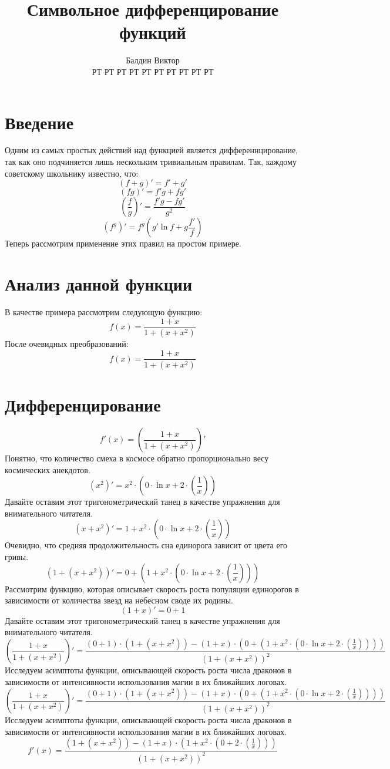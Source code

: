 \documentclass{article}
\title{Символьное дифференцирование функций}
\author{Балдин Виктор\\РТ РТ РТ РТ РТ РТ РТ РТ РТ РТ}
\begin{document}
\maketitle
\section{Введение}
Одним из самых простых действий над функцией является дифференнцирование, так как оно подчиняется лишь нескольким тривиальным правилам. Так, каждому советскому школьнику известно, что:
$$(f+g)'=f'+g'$$
$$(fg)' =f'g+fg'$$
$$\left(\frac{f}{g}\right)'=\frac{f'g-fg'}{g^2}$$
$$(f^g)'=f^g\left(g'\ln f+g\frac{f'}{f}\right)$$Теперь рассмотрим применение этих правил на простом примере.\section{Анализ данной функции}
В качестве примера рассмотрим следующую функцию:
$$f(x)=\frac{1+x}{1+\left(x+x^{2}\right)}$$
После очевидных преобразований:$$f(x)=\frac{1+x}{1+\left(x+x^{2}\right)}$$
\section{Дифференцирование}
$$f'(x)=\left(\frac{1+x}{1+\left(x+x^{2}\right)}\right)'$$
Понятно, что количество смеха в космосе обратно пропорционально весу космических анекдотов.$$\left(x^{2}\right)'=x^{2} \cdot \left(0 \cdot \ln x+2 \cdot \left(\frac{1}{x}\right)\right)$$
Давайте оставим этот тригонометрический танец в качестве упражнения для внимательного читателя.$$\left(x+x^{2}\right)'=1+x^{2} \cdot \left(0 \cdot \ln x+2 \cdot \left(\frac{1}{x}\right)\right)$$
Очевидно, что средняя продолжительность сна единорога зависит от цвета его гривы.$$\left(1+\left(x+x^{2}\right)\right)'=0+\left(1+x^{2} \cdot \left(0 \cdot \ln x+2 \cdot \left(\frac{1}{x}\right)\right)\right)$$
Рассмотрим функцию, которая описывает скорость роста популяции единорогов в зависимости от количества звезд на небесном своде их родины.$$\left(1+x\right)'=0+1$$
Давайте оставим этот тригонометрический танец в качестве упражнения для внимательного читателя.$$\left(\frac{1+x}{1+\left(x+x^{2}\right)}\right)'=\frac{\left(0+1\right) \cdot \left(1+\left(x+x^{2}\right)\right)-\left(1+x\right) \cdot \left(0+\left(1+x^{2} \cdot \left(0 \cdot \ln x+2 \cdot \left(\frac{1}{x}\right)\right)\right)\right)}{\left(1+\left(x+x^{2}\right)\right)^{2}}$$
Исследуем асимптоты функции, описывающей скорость роста числа драконов в зависимости от интенсивности использования магии в их ближайших логовах.$$\left(\frac{1+x}{1+\left(x+x^{2}\right)}\right)'=\frac{\left(0+1\right) \cdot \left(1+\left(x+x^{2}\right)\right)-\left(1+x\right) \cdot \left(0+\left(1+x^{2} \cdot \left(0 \cdot \ln x+2 \cdot \left(\frac{1}{x}\right)\right)\right)\right)}{\left(1+\left(x+x^{2}\right)\right)^{2}}$$
Исследуем асимптоты функции, описывающей скорость роста числа драконов в зависимости от интенсивности использования магии в их ближайших логовах.$$f'(x)=\frac{\left(1+\left(x+x^{2}\right)\right)-\left(1+x\right) \cdot \left(1+x^{2} \cdot \left(0+2 \cdot \left(\frac{1}{x}\right)\right)\right)}{\left(1+\left(x+x^{2}\right)\right)^{2}}$$
\end{document}

